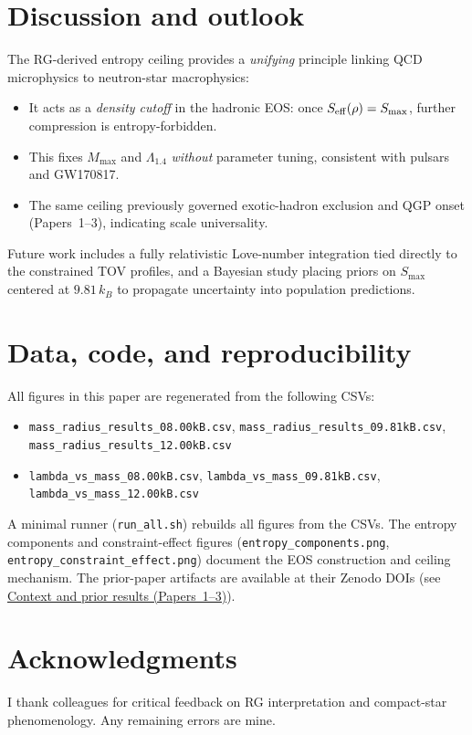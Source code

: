 \documentclass[11pt]{article}
\begin{document}
\section{Discussion and outlook}
\label{sec:discussion}
The RG-derived entropy ceiling provides a \emph{unifying} principle linking QCD microphysics to neutron-star macrophysics:
\begin{itemize}[leftmargin=1.2em]
\item It acts as a \emph{density cutoff} in the hadronic EOS: once $S_{\rm eff}(\rho)=S_{\max}$, further compression is entropy-forbidden. 
\item This fixes $M_{\max}$ and $\Lambda_{1.4}$ \emph{without} parameter tuning, consistent with pulsars and GW170817.
\item The same ceiling previously governed exotic-hadron exclusion and QGP onset (Papers~1--3), indicating scale universality.
\end{itemize}
Future work includes a fully relativistic Love-number integration tied directly to the constrained TOV profiles, and a Bayesian study placing priors on $S_{\max}$ centered at $9.81\,k_B$ to propagate uncertainty into population predictions.

\section*{Data, code, and reproducibility}
\noindent
All figures in this paper are regenerated from the following CSVs:
\begin{itemize}[leftmargin=1.2em]
\item \texttt{mass\_radius\_results\_08.00kB.csv}, 
\texttt{mass\_radius\_results\_09.81kB.csv}, 
\texttt{mass\_radius\_results\_12.00kB.csv}
\item \texttt{lambda\_vs\_mass\_08.00kB.csv}, 
\texttt{lambda\_vs\_mass\_09.81kB.csv}, 
\texttt{lambda\_vs\_mass\_12.00kB.csv}
\end{itemize}
A minimal runner (\texttt{run\_all.sh}) rebuilds all figures from the CSVs. The entropy components and
constraint-effect figures (\texttt{entropy\_components.png}, \texttt{entropy\_constraint\_effect.png}) document
the EOS construction and ceiling mechanism. The prior-paper artifacts are available at their Zenodo
DOIs (see \hyperref[sec:context]{Context and prior results (Papers~1--3)}).


\section*{Acknowledgments}
I thank colleagues for critical feedback on RG interpretation and compact-star phenomenology. Any remaining errors are mine.
\end{document}
